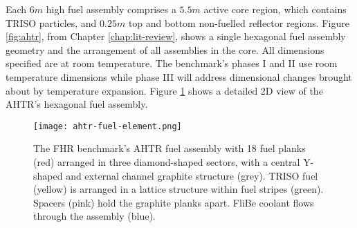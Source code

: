 Each $6m$ high fuel assembly comprises a $5.5m$ active core region, which contains
\gls{TRISO} particles, and $0.25m$ top and bottom non-fuelled reflector regions.
Figure \ref{fig:ahtr}, from Chapter \ref{chap:lit-review}, shows a single 
hexagonal fuel assembly geometry and the arrangement of all assemblies in the core.
All dimensions specified are at room temperature. 
The benchmark's phases I and II use room temperature dimensions while phase III 
will address dimensional changes brought about by temperature expansion. 
Figure \ref{fig:ahtr-fuel-assembly} shows a detailed 2D view of the 
\gls{AHTR}'s hexagonal fuel assembly. 
\begin{figure}[htbp]
    \centering
    \texttt{[image: ahtr-fuel-element.png]} 
            \hspace{0.5cm}
    \caption{The \acrfull{FHR} benchmark's \acrfull{AHTR} fuel assembly with 18 fuel 
    planks (red) arranged in three diamond-shaped sectors, with a central Y-shaped and 
    external channel graphite structure (grey). 
    TRISO fuel (yellow) is arranged in a lattice structure within fuel stripes (green). 
    Spacers (pink) hold the graphite planks apart. 
    FliBe coolant flows through the assembly (blue). }
    \label{fig:ahtr-fuel-assembly}
\end{figure}
